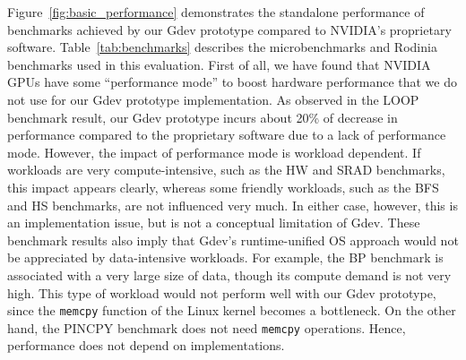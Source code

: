Figure~\ref{fig:basic_performance} demonstrates the standalone
performance of benchmarks achieved by our Gdev prototype compared to
NVIDIA's proprietary software.
Table~\ref{tab:benchmarks} describes the microbenchmarks and
Rodinia~\cite{Che_IISWC09} benchmarks used in this evaluation.
First of all, we have found that NVIDIA GPUs have some ``performance
mode'' to boost hardware performance that we do not use for our Gdev
prototype implementation.
As observed in the LOOP benchmark result, our Gdev prototype incurs
about 20\% of decrease in performance compared to the proprietary
software due to a lack of performance mode.
However, the impact of performance mode is workload dependent.
If workloads are very compute-intensive, such as the HW and SRAD
benchmarks, this impact appears clearly, whereas some friendly
workloads, such as the BFS and HS benchmarks, are not influenced very
much.
In either case, however, this is an implementation issue, but is
not a conceptual limitation of Gdev.
These benchmark results also imply that Gdev's runtime-unified OS
approach would not be appreciated by data-intensive workloads.
For example, the BP benchmark is associated with a very large size of data,
though its compute demand is not very high.
This type of workload would not perform well with our Gdev prototype, since
the \texttt{memcpy} function of the Linux kernel becomes a bottleneck.
On the other hand, the PINCPY benchmark does not need \texttt{memcpy}
operations.
Hence, performance does not depend on implementations.

